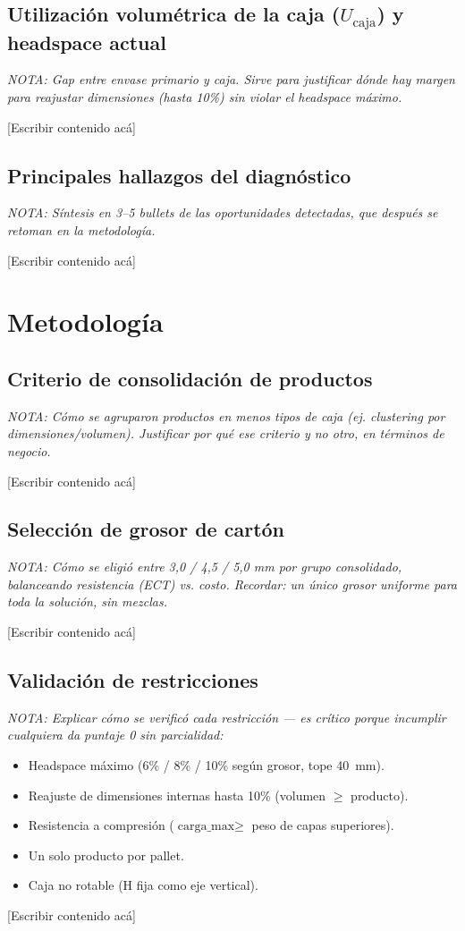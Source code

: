 \documentclass[11pt]{article}
\newcommand{\nota}[1]{{\itshape\color{notegray}\small NOTA: #1}\par\vspace{2pt}}
\newenvironment{notalist}{\begin{itemize}[itemsep=1pt,topsep=2pt,leftmargin=1.4em]\itshape\color{notegray}\small}{\end{itemize}\vspace{2pt}}
\newcommand{\placeholder}{\color{placeholdergray}[Escribir contenido acá]\color{black}\par\vspace{6pt}}
\begin{document}
\subsection{Utilización volumétrica de la caja (\texorpdfstring{$U_{\text{caja}}$}{U\_caja}) y headspace actual}
\nota{Gap entre envase primario y caja. Sirve para justificar dónde hay margen para reajustar dimensiones (hasta 10\%) sin violar el headspace máximo.}
\placeholder

\subsection{Principales hallazgos del diagnóstico}
\nota{Síntesis en 3--5 bullets de las oportunidades detectadas, que después se retoman en la metodología.}
\placeholder

\section{Metodología}

\subsection{Criterio de consolidación de productos}
\nota{Cómo se agruparon productos en menos tipos de caja (ej. clustering por dimensiones/volumen). Justificar por qué ese criterio y no otro, en términos de negocio.}
\placeholder

\subsection{Selección de grosor de cartón}
\nota{Cómo se eligió entre 3,0 / 4,5 / 5,0 mm por grupo consolidado, balanceando resistencia (ECT) vs. costo. Recordar: un único grosor uniforme para toda la solución, sin mezclas.}
\placeholder

\subsection{Validación de restricciones}
\nota{Explicar cómo se verificó cada restricción --- es crítico porque incumplir cualquiera da puntaje 0 sin parcialidad:}
\begin{notalist}
\item Headspace máximo (6\% / 8\% / 10\% según grosor, tope 40~mm).
\item Reajuste de dimensiones internas hasta 10\% (volumen $\geq$ producto).
\item Resistencia a compresión ($\text{carga\_max} \geq$ peso de capas superiores).
\item Un solo producto por pallet.
\item Caja no rotable (H fija como eje vertical).
\end{notalist}
\placeholder
\end{document}
